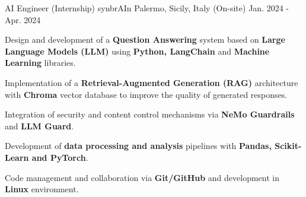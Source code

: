 \begin{cventries}
  \cventry
    {AI Engineer (Internship)}
    {synbrAIn}
    {Palermo, Sicily, Italy (On-site)}
    {Jan. 2024 - Apr. 2024}
    {
      \begin{cvitems}
        \item {Design and development of a \textbf{Question Answering} system based on \textbf{Large Language Models (LLM)} using \textbf{Python, LangChain} and \textbf{Machine Learning} libraries.}
        \item {Implementation of a \textbf{Retrieval-Augmented Generation (RAG)} architecture with \textbf{Chroma} vector database to improve the quality of generated responses.}
        \item {Integration of security and content control mechanisms via \textbf{NeMo Guardrails} and \textbf{LLM Guard}.}
        \item {Development of \textbf{data processing and analysis} pipelines with \textbf{Pandas, Scikit-Learn and PyTorch}.}
        \item {Code management and collaboration via \textbf{Git/GitHub} and development in \textbf{Linux} environment.}
      \end{cvitems}
    }

\end{cventries}
